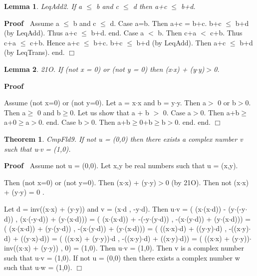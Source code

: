 \documentclass{article}
\newenvironment{forthel}{\begin{leftbar}}{\end{leftbar}}
\newenvironment{proof}{\noindent\textbf{Proof\ }}{\hspace*{\fill}$\Box$\medskip}
\newtheorem{lemma}{Lemma}
\newtheorem{theorem}{Theorem}
\newcommand{\cmul}{\cdot}
\begin{document}
\begin{forthel}
\begin{lemma} LeqAdd2.  If a $\leq$ b and c $\leq$ d then a+c $\leq$ b+d.

\end{lemma}
\begin{proof}
			Assume a $\leq$ b and c $\leq$ d. 
Case a=b. Then a+c = b+c. b+c $\leq$ b+d (by LeqAdd). Thus a+c $\leq$ b+d. end.
Case a $<$ b. Then c+a $<$ c+b. Thus c+a $\leq$ c+b. Hence a+c $\leq$ b+c. b+c $\leq$ b+d (by LeqAdd).
Then a+c $\leq$ b+d (by LeqTrans). end.
\end{proof}



\begin{lemma} 21O. If (not x = 0) or (not y = 0) then (x$\cdot$x) + (y$\cdot$y)$>$0.

\end{lemma}
\begin{proof}
 
Assume (not x=0) or (not y=0).
Let a = x$\cdot$x and b = y$\cdot$y.
Then a$>$ 0 or b$>$0.
Then a$\geq$ 0 and b$\geq$0.
Let us show that a + b $>$ 0.
Case a$>$0. Then a+b$\geq$a+0$\geq$a$>$0. end.
Case b$>$0. Then a+b$\geq$0+b$\geq$b$>$0. end.
end.
\end{proof}


\begin{theorem}
 CmpFld9. If not u = (0,0) then there exists a complex number v such that u$\cmul$v = (1,0).
\end{theorem}\begin{proof}
 Assume not u = (0,0).
Let x,y be real numbers such that u = (x,y).

Then (not x=0) or (not y=0).
Then (x$\cdot$x) + (y$\cdot$y)$>$0 (by 21O).
Then not (x$\cdot$x) + (y$\cdot$y) = 0 .

Let d = inv((x$\cdot$x) + (y$\cdot$y)) and 
v = (x$\cdot$d , -y$\cdot$d). 
Then u$\cmul$v = ( (x$\cdot$(x$\cdot$d)) - (y$\cdot$(-y$\cdot$d)) , (x$\cdot$(-y$\cdot$d)) + (y$\cdot$(x$\cdot$d)))
= ( (x$\cdot$(x$\cdot$d)) + -(-y$\cdot$(y$\cdot$d)) , -(x$\cdot$(y$\cdot$d)) + (y$\cdot$(x$\cdot$d)))
= ( (x$\cdot$(x$\cdot$d)) + (y$\cdot$(y$\cdot$d)) , -(x$\cdot$(y$\cdot$d)) + (y$\cdot$(x$\cdot$d)))
= ( ((x$\cdot$x)$\cdot$d) + ((y$\cdot$y)$\cdot$d) , -((x$\cdot$y)$\cdot$d) + ((y$\cdot$x)$\cdot$d))
= ( ((x$\cdot$x) + (y$\cdot$y))$\cdot$d , -((x$\cdot$y)$\cdot$d) + ((x$\cdot$y)$\cdot$d))
= ( ((x$\cdot$x) + (y$\cdot$y))$\cdot$inv((x$\cdot$x) + (y$\cdot$y)) , 0)
= (1,0).
Then u$\cmul$v = (1,0).
Then v is a complex number such that u$\cmul$v = (1,0).
If not u = (0,0) then there exists a complex number w such that u$\cmul$w = (1,0).
\end{proof}






\end{forthel}
\end{document}
